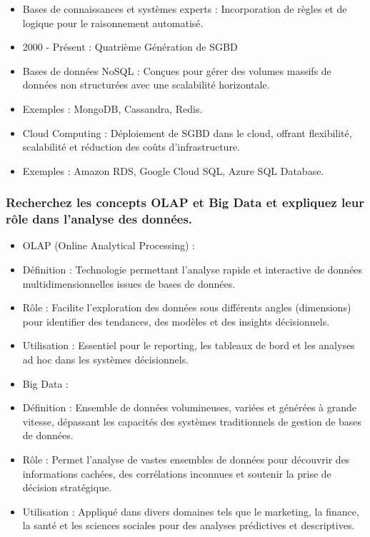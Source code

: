 \documentclass{article}
\begin{document}
\begin{itemize}
  \item Bases de connaissances et systèmes experts : Incorporation de règles et de logique pour le raisonnement automatisé.
  \item 2000 - Présent : Quatrième Génération de SGBD
  \item Bases de données NoSQL : Conçues pour gérer des volumes massifs de données non structurées avec une scalabilité horizontale.
  \item Exemples : MongoDB, Cassandra, Redis.
  \item Cloud Computing : Déploiement de SGBD dans le cloud, offrant flexibilité, scalabilité et réduction des coûts d’infrastructure.
  \item Exemples : Amazon RDS, Google Cloud SQL, Azure SQL Database.
\end{itemize}

\subsubsection{Recherchez les concepts OLAP et Big Data et expliquez leur rôle dans l’analyse des données.}

\begin{itemize}
  \item OLAP (Online Analytical Processing) :
  \item Définition : Technologie permettant l’analyse rapide et interactive de données multidimensionnelles issues de bases de données.
  \item Rôle : Facilite l’exploration des données sous différents angles (dimensions) pour identifier des tendances, des modèles et des insights décisionnels.
  \item Utilisation : Essentiel pour le reporting, les tableaux de bord et les analyses ad hoc dans les systèmes décisionnels.
  \item Big Data :
  \item Définition : Ensemble de données volumineuses, variées et générées à grande vitesse, dépassant les capacités des systèmes traditionnels de gestion de bases de données.
  \item Rôle : Permet l’analyse de vastes ensembles de données pour découvrir des informations cachées, des corrélations inconnues et soutenir la prise de décision stratégique.
  \item Utilisation : Appliqué dans divers domaines tels que le marketing, la finance, la santé et les sciences sociales pour des analyses prédictives et descriptives.
\end{itemize}
\end{document}

